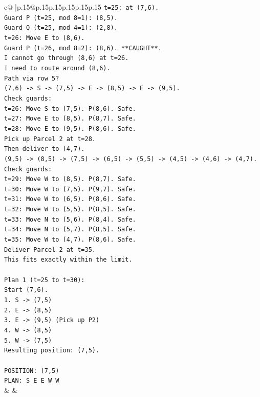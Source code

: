 \documentclass{article}
\begin{document}
{\begin{supertabular}{c@{$\;$}|p{.15\linewidth}@{}p{.15\linewidth}p{.15\linewidth}p{.15\linewidth}p{.15\linewidth}p{.15\linewidth}}
{{{\texttt{t=25: at (7,6).} \\
\texttt{Guard P (t=25, mod 8=1): (8,5).} \\
\texttt{Guard Q (t=25, mod 4=1): (2,8).} \\
\texttt{t=26: Move E to (8,6).} \\
\texttt{Guard P (t=26, mod 8=2): (8,6). **CAUGHT**.} \\
\texttt{I cannot go through (8,6) at t=26.} \\
\texttt{I need to route around (8,6).} \\
\texttt{Path via row 5?} \\
\texttt{(7,6) {-}> S {-}> (7,5) {-}> E {-}> (8,5) {-}> E {-}> (9,5).} \\
\texttt{Check guards:} \\
\texttt{t=26: Move S to (7,5). P(8,6). Safe.} \\
\texttt{t=27: Move E to (8,5). P(8,7). Safe.} \\
\texttt{t=28: Move E to (9,5). P(8,6). Safe.} \\
\texttt{Pick up Parcel 2 at t=28.} \\
\texttt{Then deliver to (4,7).} \\
\texttt{(9,5) {-}> (8,5) {-}> (7,5) {-}> (6,5) {-}> (5,5) {-}> (4,5) {-}> (4,6) {-}> (4,7).} \\
\texttt{Check guards:} \\
\texttt{t=29: Move W to (8,5). P(8,7). Safe.} \\
\texttt{t=30: Move W to (7,5). P(9,7). Safe.} \\
\texttt{t=31: Move W to (6,5). P(8,6). Safe.} \\
\texttt{t=32: Move W to (5,5). P(8,5). Safe.} \\
\texttt{t=33: Move N to (5,6). P(8,4). Safe.} \\
\texttt{t=34: Move N to (5,7). P(8,5). Safe.} \\
\texttt{t=35: Move W to (4,7). P(8,6). Safe.} \\
\texttt{Deliver Parcel 2 at t=35.} \\
\texttt{This fits exactly within the limit.} \\
\\ 
\texttt{Plan 1 (t=25 to t=30):} \\
\texttt{Start (7,6).} \\
\texttt{1. S {-}> (7,5)} \\
\texttt{2. E {-}> (8,5)} \\
\texttt{3. E {-}> (9,5) (Pick up P2)} \\
\texttt{4. W {-}> (8,5)} \\
\texttt{5. W {-}> (7,5)} \\
\texttt{Resulting position: (7,5).} \\
\\ 
\texttt{POSITION: (7,5)} \\
\texttt{PLAN: S E E W W} \\
            }
        }
    }
    & & \\ \\


\end{supertabular}}
\end{document}
